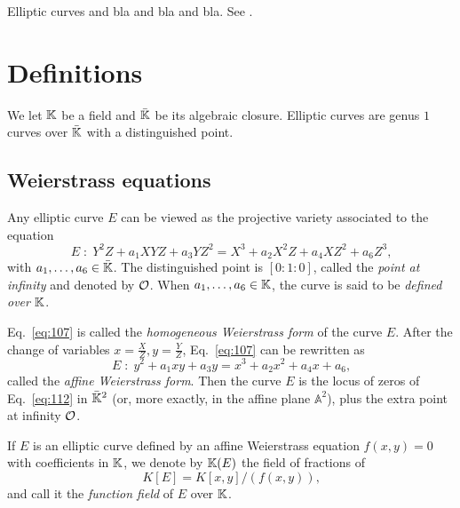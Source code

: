 Elliptic curves and bla and bla and bla. See
\cite{silverman:elliptic,silverman:advanced,blake+seroussi+smart,milne1996elliptic,connell:elliptic}.

\section{Definitions}
\label{sec:definitions}

We let $\mathbb{K}$ be a field and $\bar{\mathbb{K}}$ be its algebraic
closure. Elliptic curves are genus $1$ curves
over $\bar{\mathbb{K}}$ with a distinguished point.

\subsection{Weierstrass equations}
\label{sec:weierstr-equat}

\begin{definition}
   Any elliptic curve $E$ can be viewed as
  the projective variety associated to the equation
  \begin{equation}
    \label{eq:107}
    E\;:\; Y^2Z + a_1XYZ + a_3YZ^2 = X^3 + a_2X^2Z + a_4XZ^2 + a_6Z^3
    \text{,}
  \end{equation}
  with $a_1,\ldots,a_6\in\bar{\mathbb{K}}$.  The distinguished point is
  $[0:1:0]$, called the \emph{point at
    infinity} and denoted by $\mathcal{O}$.  When $a_1,\ldots,a_6\in\mathbb{K}$, the
  curve is said to be \emph{defined over $\mathbb{K}$}.
\end{definition}

Eq.~\eqref{eq:107} is called the \emph{homogeneous Weierstrass
  form} of the curve $E$.  After
the change of variables $x=\frac{X}{Z},y=\frac{Y}{Z}$,
Eq.~\eqref{eq:107} can be rewritten as
\begin{equation}
  \label{eq:112}
  E\;:\;y^2 + a_1xy + a_3y = x^3 + a_2x^2 + a_4x + a_6
  \text{,}
\end{equation}
called the \emph{affine Weierstrass
  form}. Then the curve $E$ is the
locus of zeros of Eq.~\eqref{eq:112} in $\bar{\mathbb{K}}^2$ (or, more
exactly, in the affine plane $\mathbb{A}^2$), plus the extra point at
infinity $\mathcal{O}$.

\begin{definition}
  If $E$ is an elliptic curve defined by an affine Weierstrass
  equation $f(x,y)=0$ with coefficients in $\mathbb{K}$, we denote by $\mathbb{K}(E)$%
   the
  field of fractions of
  \begin{equation}
    \label{eq:125}
    K[E]=K[x,y]/(f(x,y))
    \text{,}
  \end{equation}
  and call it the \emph{function field} of $E$
  over $\mathbb{K}$.
\end{definition}

